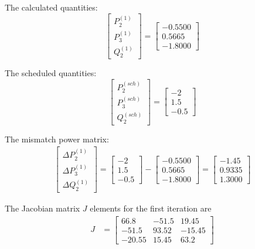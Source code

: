 \documentclass[11pt, oneside, reqno]{amsart}
\numberwithin{equation}{section}
\theoremstyle{plain}%
\theoremstyle{definition}
\theoremstyle{remark}
\begin{document}
The calculated quantities: 
\[\begin{bmatrix}
	P^{(1)}_2 \\
	P^{(1)}_3\\
	Q^{(1)}_2
\end{bmatrix} =
\begin{bmatrix}
	-0.5500\\
	0.5665\\
	-1.8000
\end{bmatrix}\]

The scheduled quantities: 
\[\begin{bmatrix}
	P^{(sch)}_2 \\
	P^{(sch)}_3\\
	Q^{(sch)}_2
\end{bmatrix} =
\begin{bmatrix}
	-2\\
	1.5\\
	-0.5
\end{bmatrix}\]

The mismatch power matrix:
\begin{align*}
	\begin{bmatrix}
	\Delta P^{(1)}_2 \\
	\Delta P^{(1)}_3\\
	\Delta Q^{(1)}_2
\end{bmatrix} =
\begin{bmatrix}
	-2\\
	1.5\\
	-0.5
\end{bmatrix}
-
\begin{bmatrix}
	-0.5500\\
	0.5665\\
	-1.8000
\end{bmatrix}
=
\begin{bmatrix}
	-1.45\\
	0.9335\\
	1.3000
\end{bmatrix}
\end{align*}

The Jacobian matrix $J$ elements for the first iteration are 
\begin{align*}
	J&=
	\begin{bmatrix}
	66.8 & -51.5 & 19.45\\
	-51.5 & 93.52 & -15.45\\
	-20.55 & 15.45 & 63.2	
	\end{bmatrix}
\end{align*}
\end{document}
